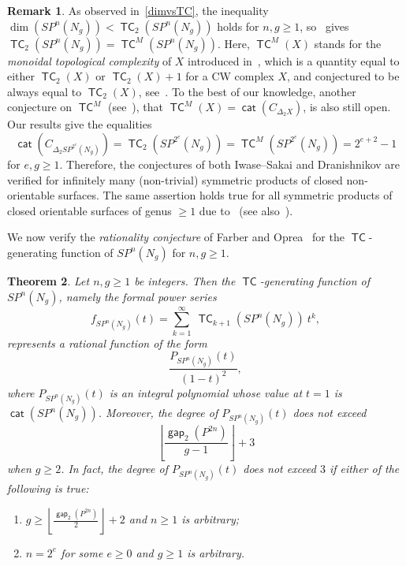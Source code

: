 \documentclass[amscd,amssymb,verbatim,10pt]{amsart}
\numberwithin{equation}{section}
\theoremstyle{plain}
\newtheorem{thm}{Theorem}[section]
\theoremstyle{definition}
\newtheorem{remark}[thm]{Remark}
\DeclareMathOperator{\cat}{{\mathsf{cat}}}
\DeclareMathOperator{\TC}{{\mathsf{TC}}}
\DeclareMathOperator{\gap}{{\mathsf{gap}}}
\begin{document}
\begin{remark}\label{rem: monoidal}
    As observed in~\eqref{dimvsTC}, the inequality $\dim(SP^n(N_g))<\TC_2(SP^n(N_g))$ holds for $n,g\ge 1$, so~\cite[Theorem~2.5]{Dr1} gives $\TC_2(SP^n(N_g))=\TC^M(SP^n(N_g))$. Here, $\TC^M(X)$ stands for the \emph{monoidal topological complexity} of $X$ introduced in~\cite{IS}, which is a quantity equal to either $\TC_2(X)$ or $\TC_2(X)+1$ for a CW complex $X$, and conjectured to be always equal to $\TC_2(X)$, see~\cite{IS}. To the best of our knowledge, another conjecture on $\TC^M$ (see~\cite[Section~4]{Dr1}), that $\TC^M(X)=\cat(C_{\Delta_2X})$, is also still open. Our results give the equalities
    \[
\cat(C_{\Delta_2SP^{2^e}(N_g)})=\TC_2(SP^{2^e}(N_g))=\TC^M(SP^{2^e}(N_g))=2^{e+2}-1
    \]
    for $e,g\ge 1$. Therefore, the conjectures of both Iwase--Sakai and Dranishnikov are verified for infinitely many (non-trivial) symmetric products of closed non-orientable surfaces. The same assertion holds true for all symmetric products of closed orientable surfaces of genus $\ge 1$ due to~\cite[Theorem~6.8]{DCDJ} (see also~\cite{Ja}).
\end{remark}



We now verify the \emph{rationality conjecture} of Farber and Oprea~\cite{FO} for the $\TC$-generating function of $SP^n(N_g)$ for $n,g\ge 1$.

\begin{thm}\label{thm: rationality}
    Let $n,g\ge 1$ be integers. Then the $\TC$-generating function of $SP^n(N_g)$, namely the formal power series 
    \[
    f_{SP^n(N_g)}(t)=\sum_{k=1}^{\infty}\ \TC_{k+1}(SP^n(N_g))\ t^k,
    \]
    represents a rational function of the form 
    \[
    \frac{P_{SP^n(N_g)}(t)}{(1-t)^2},
    \]
    where $P_{SP^n(N_g)}(t)$ is an integral polynomial whose value at $t=1$ is $\cat(SP^n(N_g))$. Moreover, the degree of $P_{SP^n(N_g)}(t)$ does not exceed
    \[
        \left\lfloor \frac{\gap_2(P^{2n})}{g-1} \right\rfloor + 3
    \]
    when $g\ge 2$. In fact, the degree of $P_{SP^n(N_g)}(t)$ does not exceed $3$ if either of the following is true:
    \begin{enumerate}
     \item $g\ge \left\lfloor \tfrac{\gap_2(P^{2n})}{2} \right\rfloor+2$ and $n\ge 1$ is arbitrary;
        \item $n=2^e$ for some $e\ge 0$ and $g\ge 1$ is arbitrary.
    \end{enumerate}
\end{thm}
\end{document}
